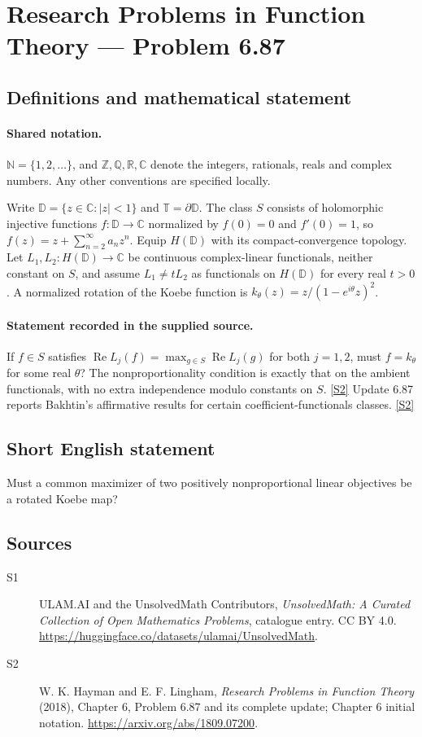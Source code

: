 \documentclass[11pt]{article}
\newcommand{\sref}[2]{\hyperlink{source:#1:#2}{[S#2]}}
\begin{document}
\section{Research Problems in Function Theory — Problem 6.87}\label{statement}

\subsection{Definitions and mathematical statement}

\paragraph{Shared notation.}$\mathbb N=\{1,2,\ldots\}$, and $\mathbb Z,\mathbb Q,\mathbb R,\mathbb C$ denote the integers, rationals, reals and complex numbers. Any other conventions are specified locally.


Write $\mathbb D=\{z\in\mathbb C:|z|<1\}$ and $\mathbb T=\partial\mathbb D$. The class $S$ consists of holomorphic injective functions $f:\mathbb D\to\mathbb C$ normalized by $f(0)=0$ and $f'(0)=1$, so $f(z)=z+\sum_{n=2}^{\infty}a_nz^n$. Equip $H(\mathbb D)$ with its compact-convergence topology. Let $L_1,L_2:H(\mathbb D)\to\mathbb C$ be continuous complex-linear functionals, neither constant on $S$, and assume $L_1\ne tL_2$ as functionals on $H(\mathbb D)$ for every real $t>0$. A normalized rotation of the Koebe function is $k_\theta(z)=z/(1-e^{i\theta}z)^2$.
\paragraph{Statement recorded in the supplied source.}
If $f\in S$ satisfies $\operatorname{Re}L_j(f)=\max_{g\in S}\operatorname{Re}L_j(g)$ for both $j=1,2$, must $f=k_\theta$ for some real $\theta$? The nonproportionality condition is exactly that on the ambient functionals, with no extra independence modulo constants on $S$. \sref{statement}{2}
Update 6.87 reports Bakhtin's affirmative results for certain coefficient-functionals classes. \sref{statement}{2}
\subsection{Short English statement}
Must a common maximizer of two positively nonproportional linear objectives be a rotated Koebe map?
\subsection{Sources}
\begin{description}
\item[\hypertarget{source:statement:1}{S1}] ULAM.AI and the UnsolvedMath Contributors, \emph{UnsolvedMath: A Curated Collection of Open Mathematics Problems}, catalogue entry. CC BY 4.0. \url{https://huggingface.co/datasets/ulamai/UnsolvedMath}.
\item[\hypertarget{source:statement:2}{S2}] W. K. Hayman and E. F. Lingham, \emph{Research Problems in Function Theory} (2018), Chapter 6, Problem 6.87 and its complete update; Chapter 6 initial notation. \url{https://arxiv.org/abs/1809.07200}.
\end{description}
\label{end:statement}
\end{document}
